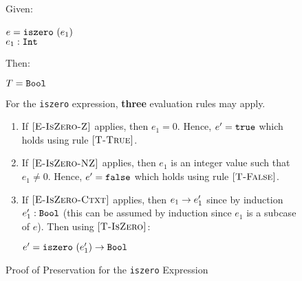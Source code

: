 \documentclass{report}
\newcommand{\rel}[1]{\mbox{\sc [#1]}}
\begin{document}
\begin{figure}[ht!]
Given:
\begin{center}
   $e = \mbox{\tt iszero}~(e_1)$~\\
   ${e_1} : {\mbox{\tt Int}}$
\end{center}
Then:
\begin{center}
   $T = \mbox{\tt Bool}$
\end{center}
For the \texttt{iszero} expression, \textbf{three} evaluation rules may apply.
\begin{enumerate}

    \item If $\rel{E-IsZero-Z}$ applies, then $e_1 = 0$.  Hence, $e' = \mbox{\tt true}$ which holds using rule $\rel{T-True}$.
      
    \item If $\rel{E-IsZero-NZ}$ applies, then $e_1$ is an integer value such that $e_1 \ne 0$.  Hence, $e' = \mbox{\tt false}$ which holds using rule $\rel{T-False}$.
    
    \item If $\rel{E-IsZero-Ctxt}$ applies, then ${e_1} \rightarrow {e'_1}$ since by induction ${e'_1} : {\mbox{\tt Bool}}$ (this can be assumed by induction since $e_1$ is a subcase of $e$).  Then using $\rel{T-IsZero}$:
    
    \begin{center}
      ${e' = \mbox{\tt iszero}~(e'_1)} \rightarrow {\mbox{\tt Bool}}$
    \end{center}
    
\end{enumerate}

  \caption{Proof of Preservation for the \texttt{iszero} Expression}\label{fig:isZeroProofPreservation}
\end{figure} 
\end{document}
